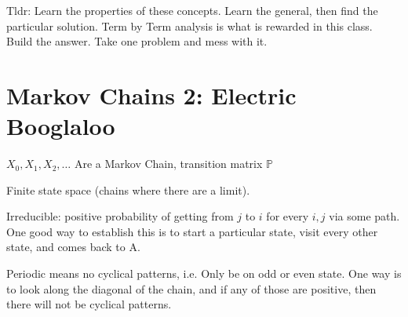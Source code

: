 \documentclass{report}
\begin{document}

Tldr: Learn the properties of these concepts. Learn the general, then find the particular solution. Term by Term analysis is what is rewarded in this class. Build the answer. Take one problem and mess with it. 


\section{Markov Chains 2: Electric Booglaloo} 

$X_0, X_1, X_2, \dots$ Are a Markov Chain, transition matrix $ \mathbb{P} $ 

Finite state space (chains where there are a limit). 

Irreducible: positive probability of getting from $ j $ to $ i $ for every $ i,j $ via some path. One good way to establish this is to start a particular state, visit every other state, and comes back to A. 

Periodic means no cyclical patterns, i.e. Only be on odd or even state. One way is to  look along the diagonal of the chain, and if any of those are positive, then there will not be cyclical patterns. 
\end{document}
